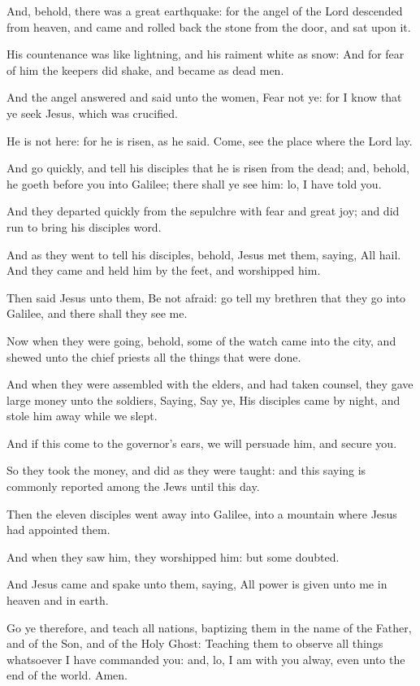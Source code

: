 \verse And, behold, there was a great earthquake: for the angel of the Lord descended from heaven, and came and rolled back the stone from the door, and sat upon it.

\verse His countenance was like lightning, and his raiment white as snow: \verse And for fear of him the keepers did shake, and became as dead men.

\verse And the angel answered and said unto the women, Fear not ye: for I know that ye seek Jesus, which was crucified.

\verse He is not here: for he is risen, as he said. Come, see the place where the Lord lay.

\verse And go quickly, and tell his disciples that he is risen from the dead; and, behold, he goeth before you into Galilee; there shall ye see him: lo, I have told you.

\verse And they departed quickly from the sepulchre with fear and great joy; and did run to bring his disciples word.

\verse And as they went to tell his disciples, behold, Jesus met them, saying, All hail. And they came and held him by the feet, and worshipped him.

\verse Then said Jesus unto them, Be not afraid: go tell my brethren that they go into Galilee, and there shall they see me.

\verse Now when they were going, behold, some of the watch came into the city, and shewed unto the chief priests all the things that were done.

\verse And when they were assembled with the elders, and had taken counsel, they gave large money unto the soldiers, \verse Saying, Say ye, His disciples came by night, and stole him away while we slept.

\verse And if this come to the governor's ears, we will persuade him, and secure you.

\verse So they took the money, and did as they were taught: and this saying is commonly reported among the Jews until this day.

\verse Then the eleven disciples went away into Galilee, into a mountain where Jesus had appointed them.

\verse And when they saw him, they worshipped him: but some doubted.

\verse And Jesus came and spake unto them, saying, All power is given unto me in heaven and in earth.

\verse Go ye therefore, and teach all nations, baptizing them in the name of the Father, and of the Son, and of the Holy Ghost: \verse Teaching them to observe all things whatsoever I have commanded you: and, lo, I am with you alway, even unto the end of the world. Amen.

